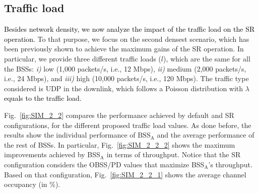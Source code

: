 \documentclass{ieeeaccess}
\begin{document}
\subsection{Traffic load}
\label{section:random_scenarios_traffic_load}
\textcolor{black}{Besides network density, we now analyze the impact of the traffic load on the SR operation.} To that purpose, we focus on the second densest scenario, which has been previously shown to achieve the maximum gains of the SR operation. In particular, we provide three different traffic loads ($l$), which are the same for all the BSSs: \emph{i)} low (1,000 packets/s, i.e., 12 Mbps), \emph{ii)} medium (2,000 packets/s, i.e., 24 Mbps), and \emph{iii)} high (10,000 packets/s, i.e., 120 Mbps). The traffic type considered is UDP in the downlink, which follows a Poisson distribution with $\lambda$ \textcolor{black}{equals to the traffic load.}

Fig.~\ref{fig:SIM_2_2} compares the performance achieved by default and SR configurations, for the different proposed traffic load values. As done before, the results show the individual performance of $\text{BSS}_\text{A}$ and the average performance of the rest of BSSs. In particular, Fig.~\ref{fig:SIM_2_2_2} shows the maximum improvements achieved by BSS$_\text{A}$ in terms of throughput. Notice that the SR configuration considers the OBSS/PD values that maximize BSS$_\text{A}$'s throughput. Based on that configuration, Fig.~\ref{fig:SIM_2_2_1} shows the average channel occupancy (in \%).
\end{document}
